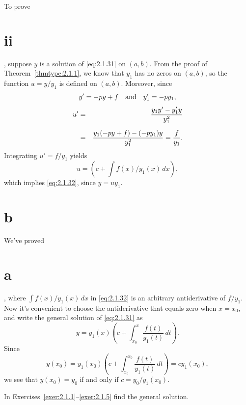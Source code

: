 To prove \part{ii}, suppose $y$ is a solution of \eqref{eq:2.1.31} on $(a,b)$. From the proof of
Theorem~\ref{thmtype:2.1.1}, we know that $y_{1}$ has no zeros on $(a,b)$, so the function
$u=y/y_{1}$ is defined on $(a,b)$. Moreover, since
\[
  y'=-py+f\mbox{\quad and\quad}y_{1}'=-py_{1},
\]
\begin{eqnarray*}
  u' & = & \frac{y_{1}y'-y_{1}'y}{y_{1}^{2}} \\[2\jot]
     & = & \frac{y_{1}(-py+f)-(-py_{1})y}{y_{1}^{2}}=\frac{f}{y_{1}}.
\end{eqnarray*}
Integrating $u'=f/y_{1}$ yields
\[
  u=\left(c+\int f(x)/y_{1}(x)\,dx\right),
\]
which implies \eqref{eq:2.1.32}, since $y=uy_{1}$.

\part{b} We've proved \part{a}, where $\int f(x)/y_{1}(x)\,dx$ in \eqref{eq:2.1.32} is an arbitrary
antiderivative of $f/y_{1}$. Now it's convenient to choose the antiderivative that equals zero when
$x=x_{0}$, and write the general solution of \eqref{eq:2.1.31} as
\[
  y=y_{1}(x)\left(c+\int^{x}_{x_{0}}\frac{f(t)}{y_{1}(t)}\,dt\right).
\]
Since
\[
  y(x_{0})=y_{1}(x_{0})\left(c+\int^{x_{0}}_{x_{0}}\frac{f(t)}{y_{1}(t)}\,dt\right)=cy_{1}(x_{0}),
\]
we see that $y(x_{0})=y_{0}$ if and only if $c=y_{0}/y_{1}(x_{0})$.

\exercises In Exercises~\ref{exer:2.1.1}--\ref{exer:2.1.5} find the general solution.

